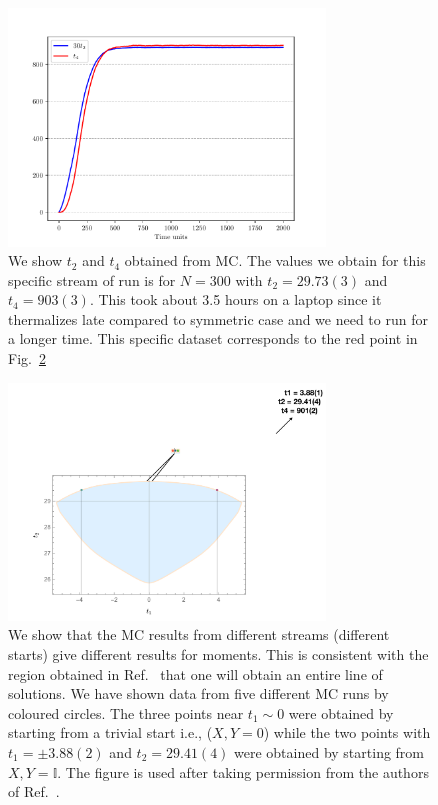 \documentclass[letter,11pt]{article}
\begin{document}
\begin{figure}[htbp] 
	\centering 
	\includegraphics[width=0.75\textwidth]{figs/2MM_symb_t2_t4.pdf}
	\caption{\label{fig:2MM_t2t4}We show $t_{2}$ and $t_{4}$ obtained from MC. 
	The values we obtain for this specific stream of run is for $N=300$ with $t_{2} = 29.73(3)$ and $t_{4} = 903(3)$. This took about 3.5 hours on a laptop since it thermalizes late compared to symmetric case and we need to run for a longer time. This specific dataset corresponds to the red point in Fig.~\ref{fig:2MM_comp1}}
\end{figure}

\begin{figure}[h] 
	\centering 
	\includegraphics[width=0.75\textwidth]{figs/2MM_symb_ms.pdf}
	\caption{\label{fig:2MM_comp1}We show that the MC results from different streams (different starts) give different results for moments. This is consistent with the region obtained in Ref.~\cite{Kazakov:2021lel} that one will obtain an entire line of solutions. We have shown data from five different MC runs by coloured circles. The three points near $t_{1} \sim 0$ were obtained by starting from a trivial start i.e., ($X,Y = 0$) while the two points with $t_{1} = \pm 3.88(2)$ and $t_{2}=29.41(4)$ were obtained by starting from $X,Y = \mathbb{I}$. The figure is used after taking permission from the authors of Ref.~\cite{Kazakov:2021lel}.}
\end{figure}
\end{document}
